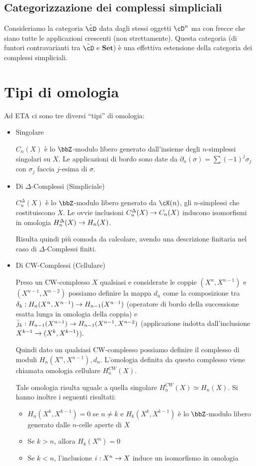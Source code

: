 \documentclass[a4paper,NoNotes,GeneralMath]{stdmdoc}
\newcommand{\Set}{\textbf{Set}}
\begin{document}
\subsection*{Categorizzazione dei complessi simpliciali}
Consideriamo la categoria $\tilde\cD$ data dagli stessi oggetti $\cD^n$ ma con frecce che siano tutte le applicazioni crescenti (non strettamente).
Questa categoria (di funtori contravarianti tra $\tilde\cD$ e $\Set$) è una effettiva estensione della categoria dei complessi simpliciali.

\section*{Tipi di omologia}
Ad ETA ci sono tre diversi ``tipi'' di omologia:
\begin{itemize}
\item Singolare

  $C_n(X)$ è lo $\bbZ$-modulo libero generato dall'insieme degli $n$-simplessi singolari su $X$.
  Le applicazioni di bordo sono date da $\partial_n(\sigma) = \sum (-1)^j \sigma_j$ con $\sigma_j$ faccia $j$-esima di $\sigma$.
\item Di $\Delta$-Complessi (Simpliciale)

  $C_n^\Delta(X)$ è lo $\bbZ$-modulo libero generato da $\cK(n)$, gli $n$-simplessi che costituiscono $X$.
  Le ovvie inclusioni $C_n^\Delta(X) \rightarrow C_n(X)$ inducono isomorfismi in omologia $H_n^\Delta(X) \rightarrow H_n(X)$.

  Risulta quindi più comoda da calcolare, avendo una descrizione finitaria nel caso di $\Delta$-Complessi finiti.
\item Di CW-Complessi (Cellulare)

  Preso un CW-complesso $X$ qualsiasi e considerate le coppie $(X^n, X^{n-1})$ e $(X^{n-1}, X^{n-2})$ possiamo definire la mappa $d_n$ come la composizione tra $\delta_k: H_n(X^n, X^{n-1}) \rightarrow H_{n-1}(X^{n-1})$ (operatore di bordo della successione esatta lunga in omologia della coppia) e $\bar j_k: H_{n-1}(X^{n-1}) \rightarrow H_{n-1}(X^{n-1}, X^{n-2})$ (applicazione indotta dall'inclusione $X^{k-1} \rightarrow (X^k, X^{k-1})$).

  Quindi dato un qualsiasi CW-complesso possiamo definire il complesso di moduli $H_n(X^n, X^{n-1}), d_n$. L'omologia definita da questo complesso viene chiamata omologia cellulare $H^{CW}_n(X)$.

  Tale omologia risulta uguale a quella singolare $H^{CW}_n(X) \simeq H_n(X)$.
  Si hanno inoltre i seguenti risultati:
  \begin{itemize}
  \item $H_n(X^k, X^{k-1}) = 0$ se $n \neq k$ e $H_k(X^k, X^{k-1})$ è lo $\bbZ$-modulo libero generato dalle $n$-celle aperte di $X$
  \item Se $k > n$, allora $H_k(X^n) = 0$
  \item Se $k < n$, l'inclusione $i: X^n \rightarrow X$ induce un isomorfismo in omologia
  \end{itemize}
\end{itemize}
\end{document}
